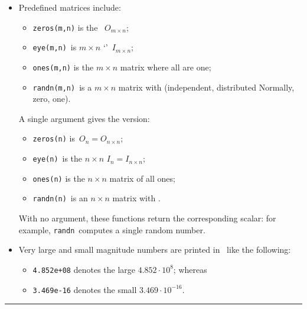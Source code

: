 \begin{table}
\begin{minipage}{\linewidth}
\begin{itemize}
\item Predefined matrices include:
\begin{itemize}
\item {}\verb|zeros(m,n)| is the ~\(O_{m\times n}\);
\item {}\verb|eye(m,n)|~is \(m\times n\) `'~\(I_{m\times n}\);
\item {}\verb|ones(m,n)| is the \(m\times n\) matrix where all  are one;
\item {}\verb|randn(m,n)|~is a \(m\times n\) matrix with  (independent, distributed Normally,  zero,  one).
\end{itemize}
A single argument gives the  version: 
\begin{itemize}
\item {}\verb|zeros(n)| is~\(O_n=O_{n\times n}\); 
\item \verb|eye(n)|~is the \(n\times n\)  \(I_n=I_{n\times n}\);  
\item \verb|ones(n)| is the \(n\times n\) matrix of all ones;
\item {}\verb|randn(n)|~is an \(n\times n\) matrix with .
\end{itemize}
With no argument, these functions return the corresponding scalar: for example, \verb|randn|~computes a single random number.
\item Very large and small magnitude numbers are printed in \script\ like the following: 
\begin{itemize}
\item \verb|4.852e+08| denotes the large \(4.852\cdot10^8\); whereas 
\item \verb|3.469e-16| denotes the small \(3.469\cdot10^{-16}\).
\end{itemize}
\end{itemize}
\end{minipage}
\smallskip\hrule
\end{table}

